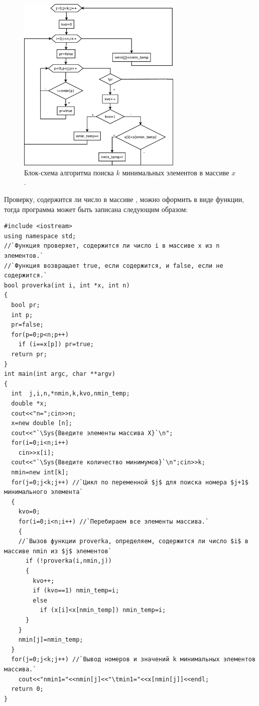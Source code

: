 \begin{figure}[htb]
\begin{center}
\includegraphics[width=0.7\textwidth]{img/ris_5_9}
\caption{Блок-схема алгоритма поиска $k$ минимальных элементов в массиве $x$.}
\label{ch05:refDrawing8}
\end{center}
\end{figure}

Проверку, содержится ли число  в массиве , можно оформить в виде функции,
тогда программа может быть записана следующим образом:
\begin{lstlisting}
#include <iostream>
using namespace std;
//`Функция проверяет, содержится ли число i в массиве x из n элементов.`
//`Функция возвращает true, если содержится, и false, если не содержится.`
bool proverka(int i, int *x, int n)
{
  bool pr;
  int p;
  pr=false;
  for(p=0;p<n;p++)
    if (i==x[p]) pr=true;
  return pr;
}
int main(int argc, char **argv)
{
  int  j,i,n,*nmin,k,kvo,nmin_temp;
  double *x;
  cout<<"n=";cin>>n;
  x=new double [n];
  cout<<"`\Sys{Введите элементы массива Х}`\n";
  for(i=0;i<n;i++)
    cin>>x[i];
  cout<<"`\Sys{Введите количество минимумов}`\n";cin>>k;
  nmin=new int[k];
  for(j=0;j<k;j++) //`Цикл по переменной $j$ для поиска номера $j+1$ минимального элемента`
  {
    kvo=0;
    for(i=0;i<n;i++) //`Перебираем все элементы массива.`
    {
    //`Вызов функции proverka, определяем, содержится ли число $i$ в массиве nmin из $j$ элементов`
      if (!proverka(i,nmin,j)) 
      {
        kvo++;
        if (kvo==1) nmin_temp=i;
        else
          if (x[i]<x[nmin_temp]) nmin_temp=i;
      }
    }
    nmin[j]=nmin_temp;		
  }
  for(j=0;j<k;j++) //`Вывод номеров и значений k минимальных элементов массива.`
    cout<<"nmin1="<<nmin[j]<<"\tmin1="<<x[nmin[j]]<<endl;
  return 0;
}
\end{lstlisting}


